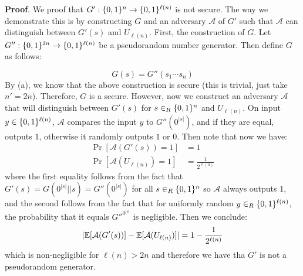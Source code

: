 \documentclass{article}
\begin{document}
\begin{enumerate}
\begin{enumerate}[noitemsep,topsep=\mdcompacttopsep,label=\alph*.]
\begin{mdbmarginx}{1ex}{0pt}{1ex}{0pt}%
\noindent{}\textbf{Proof}.  We proof that $G': \{0,1\}^{n} \to \{0,1\}^{\ell(n)}$ is not secure. The way we demonstrate
this is by constructing $G$ and an adversary $\mathcal{A}$ of $G'$ such that $\mathcal{A}$ can
distinguish between $G'(s)$ and $U_{\ell(n)}$. First, the construction of $G$. Let $G'': \{0,1\}^{2n} \to \{0,1\}^{\ell(n)}$
be a pseudorandom number generator. Then define $G$ as follows:%
\end{mdbmarginx}%
\noindent\noindent\[%
G(s) = G''(s_1\cdots s_{n}) 
\]%
By (a), we know that the above construction is secure (this is trivial, just take $n' = 2n$). 
Therefore, $G$ is a secure. However, now we construct an adversary $\mathcal{A}$ that 
will distinguish between $G'(s)$ for $s \in_R \{0,1\}^{n}$ and $U_{\ell(n)}$. On input 
$y \in \{0,1\}^{\ell(n)}$, $\mathcal{A}$ compares the input $y$ to $G''(0^{|s|})$, and if they are
equal, outputs $1$, otherwise it randomly outputs $1$ or $0$. Then note that now we have:
\noindent\noindent\[%
\begin{aligned}
\Pr[\mathcal{A}(G'(s)) = 1] &=  1\\
\Pr[\mathcal{A}(U_{\ell(n)}) = 1] &= \frac{1}{2^{\ell(n)}}
\end{aligned}
\]%
where the first equality follows from the fact that $G'(s) = G(0^{|s|} || s) = G''(0^{|s|})$ for
all $s \in_R \{0,1\}^{n}$ so $\mathcal{A}$ always outputs $1$, and the second follows from the
fact that for uniformly random $y \in_R \{0,1\}^{\ell(n)}$, the probability that it equals $G''^{0^|s|}$
is negligible. 
Then we conclude:
\noindent\noindent\[%
|\E[\mathcal{A}(G'(s))] - \E[\mathcal{A}(U_{\ell(n)})]| = 1 - \frac{1}{2^{\ell(n)}}  
\]%
which is non-negligible for $\ell(n) > 2n$ and therefore we have tha $G'$ is not a pseudorandom
generator.%


\end{enumerate}
\end{enumerate}
\end{document}
